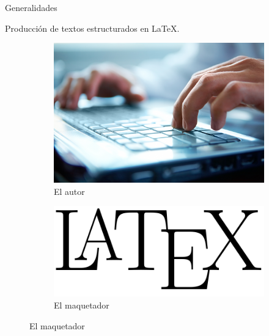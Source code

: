 \begin{frame}{Generalidades}
    \begin{block}{Producci\'on de textos estructurados en \LaTeX{}.}
        \vspace{-.4cm}
        \begin{multicols}{2}
            \begin{figure}
                \centering
                \begin{subfigure}[b]{0.5\textwidth} 
                    \centering
                    \includegraphics[scale=.08]{images/autor_LaTeX}
                    \caption{El autor}			
                \end{subfigure}

                \vspace*{.25cm}			

                \begin{subfigure}[b]{0.5\textwidth} 
                    \centering
                    \includegraphics[scale=.09]{images/maquetador_LaTeX}
                    \caption{El maquetador}
                \end{subfigure}


\end{figure}
\end{multicols}
\end{block}
\end{frame}
